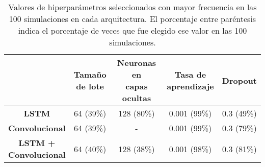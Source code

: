 \documentclass[../../main.tex]{subfiles}
\begin{document}
\begin{table}[H]
    \centering
    \renewcommand{\arraystretch}{1.2}
    \label{tab:hyperparams_exp7}
    \begin{tabular}{|c|c|c|c|c|}
        \hline
            & \makecell{\textbf{Tamaño}\\\textbf{de lote}}
            & \makecell{\textbf{Neuronas en}\\\textbf{capas ocultas}}
            & \makecell{\textbf{Tasa de}\\\textbf{aprendizaje}}
            & \textbf{Dropout} \\ \hline\hline
        \textbf{LSTM}
            & 64 (39\%) & 128 (80\%) & 0.001 (99\%) & 0.3 (49\%) \\ \hline
        \textbf{Convolucional}
            & 64 (39\%) & -          & 0.001 (99\%) & 0.3 (79\%) \\ \hline
        \makecell{\textbf{LSTM +}\\\textbf{Convolucional}}
            & 64 (40\%) & 128 (38\%) & 0.001 (98\%) & 0.3 (81\%) \\
        \hline
    \end{tabular}
    \caption{Valores de hiperparámetros seleccionados con mayor frecuencia en las 100
    simulaciones en cada arquitectura. El porcentaje entre paréntesis indica el porcentaje
    de veces que fue elegido ese valor en las 100 simulaciones.}
\end{table}
\end{document}
